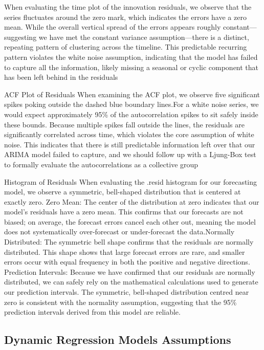 \documentclass[11pt, a4paper]{article}\usepackage[]{graphicx}\usepackage[]{xcolor}
\begin{document}
When evaluating the time plot of the innovation residuals, we observe that the series fluctuates around the zero mark, which indicates the errors have a zero mean. While the overall vertical spread of the errors appears roughly constant—suggesting we have met the constant variance assumption—there is a distinct, repeating pattern of clustering across the timeline. This predictable recurring pattern violates the white noise assumption, indicating that the model has failed to capture all the information, likely missing a seasonal or cyclic component that has been left behind in the residuals

ACF Plot of Residuals When examining the ACF plot, we observe five significant spikes poking outside the dashed blue boundary lines.For a white noise series, we would expect approximately 95\% of the autocorrelation spikes to sit safely inside these bounds. Because multiple spikes fall outside the lines, the residuals are significantly correlated across time, which violates the core assumption of white noise. This indicates that there is still predictable information left over that our ARIMA model failed to capture, and we should follow up with a Ljung-Box test to formally evaluate the autocorrelations as a collective group

Histogram of Residuals When evaluating the .resid histogram for our forecasting model, we observe a symmetric, bell-shaped distribution that is centered at exactly zero. Zero Mean: The center of the distribution at zero indicates that our model's residuals have a zero mean. This confirms that our forecasts are not biased; on average, the forecast errors cancel each other out, meaning the model does not systematically over-forecast or under-forecast the data.Normally Distributed: The symmetric bell shape confirms that the residuals are normally distributed. This shape shows that large forecast errors are rare, and smaller errors occur with equal frequency in both the positive and negative directions.
Prediction Intervals: Because we have confirmed that our residuals are normally distributed, we can safely rely on the mathematical calculations used to generate our prediction intervals. The symmetric, bell-shaped distribution centred near zero is consistent with the normality assumption, suggesting that the 95\% prediction intervals derived from this model are reliable.

\subsection{Dynamic Regression Models Assumptions}
\end{document}
